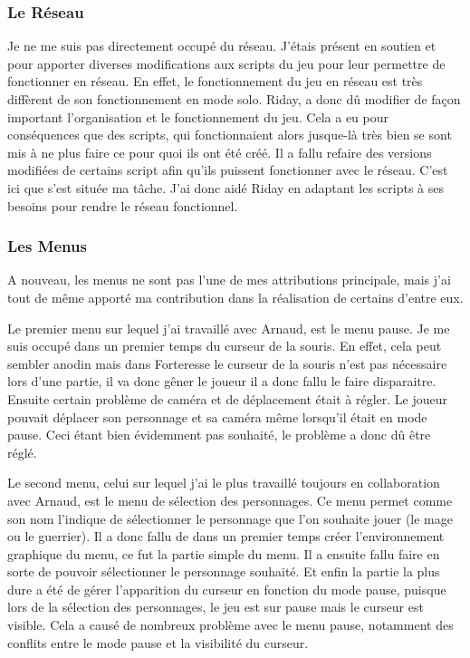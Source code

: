 \documentclass[a4paper, 12pt]{article}
\begin{document}
		\subsubsection{Le Réseau}
		Je ne me suis pas directement occupé du réseau. J’étais présent en soutien et pour apporter diverses modifications aux scripts du jeu pour leur permettre de fonctionner en réseau. En effet, le fonctionnement du jeu en réseau est très diffèrent de son fonctionnement en mode solo. Riday, a donc dû modifier de façon important l’organisation et le fonctionnement du jeu. Cela a eu pour conséquences que des scripts, qui fonctionnaient alors jusque-là très bien se sont mis à ne plus faire ce pour quoi ils ont été créé. Il a fallu refaire des versions modifiées de certains script afin qu’ils puissent fonctionner avec le réseau. C’est ici que s’est située ma tâche. J’ai donc aidé Riday en adaptant les scripts à ses besoins pour rendre le réseau fonctionnel.
		
		\subsubsection{Les Menus}
		
		A nouveau, les menus ne sont pas l’une de mes attributions principale, mais j’ai tout de même apporté ma contribution dans la réalisation de certains d’entre eux.
\par Le premier menu sur lequel j’ai travaillé avec Arnaud, est le menu pause. Je me suis occupé dans un premier temps du curseur de la souris. En effet, cela peut sembler anodin mais dans Forteresse le curseur de la souris n’est pas nécessaire lors d’une partie, il va donc gêner le joueur il a donc fallu le faire disparaitre. Ensuite certain problème de caméra et de déplacement était à régler. Le joueur pouvait déplacer son personnage et sa caméra même lorsqu’il était en mode pause. Ceci étant bien évidemment pas souhaité, le problème a donc dû être réglé. 
\par Le second menu, celui sur lequel j’ai le plus travaillé toujours en collaboration avec Arnaud, est le menu de sélection des personnages. Ce menu permet comme son nom l’indique de sélectionner le personnage que l’on souhaite jouer (le mage ou le guerrier). Il a donc fallu de dans un premier temps créer l’environnement graphique du menu, ce fut la partie simple du menu. Il a ensuite fallu faire en sorte de pouvoir sélectionner le personnage souhaité. Et enfin la partie la plus dure a été de gérer l’apparition du curseur en fonction du mode pause, puisque lors de la sélection des personnages, le jeu est sur pause mais le curseur est visible. Cela a causé de nombreux problème avec le menu pause, notamment des conflits entre le mode pause et la visibilité du curseur.
\end{document}
